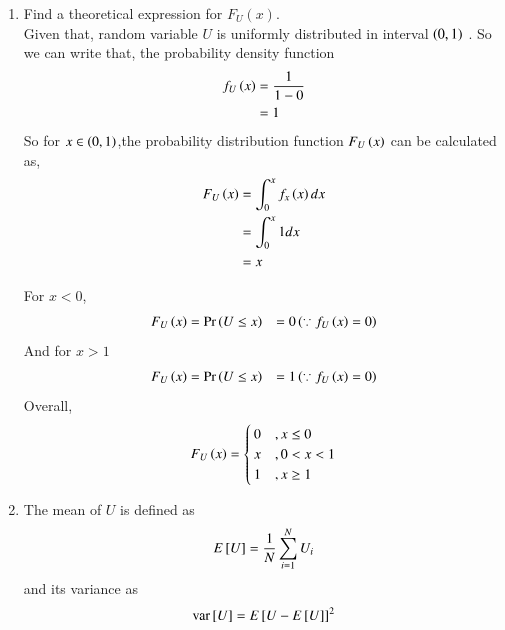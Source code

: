 \documentclass[journal,12pt,twocolumn]{IEEEtran}
\renewcommand\thesection{\arabic{section}}
\begin{document}
\begin{enumerate}[label=\thesection.\arabic*,ref=\thesection.\theenumi]
%
\item
Find a theoretical expression for $F_{U}(x)$.\\
\solution Given that, random variable $U$ is uniformly distributed in interval $\left(0,1\right)$ . So we can write that, the probability density function
               \begin{align}
                        f_{U}\left(x\right) &= \frac{1}{1 -0}\\
                                      &= 1
               \end{align}
       So for $ x \in \left(0,1\right) $,the probability distribution function $F_{U}\left(x\right)$ can be calculated as,
               \begin{align}
                           F_{U}\left(x\right) &= \int_{0}^{x} f_x\left(x\right)dx\\
                                         &= \int_{0}^{x}1dx\\
                                         &= x
                \end{align}

       For $x<0$,
		\begin{align}
			F_{U}\left(x\right) &= \Pr\left(U \leq x\right)
				      &= 0 \left(\because f_{U}\left(x\right) = 0\right)
                \end{align}
	And for $x>1$
		\begin{align}
			F_{U}\left(x\right) &= \Pr\left(U \leq x\right)
			&= 1 \left(\because f_{U}\left(x\right) = 0\right)
    \end{align}
        Overall,		
		\begin{equation*}
			F_{U}\left(x\right) = \begin{cases}      \label{cdf_U}
                                                          0  &, x \leq 0 \\
                                                          x  &, 0<x<1 \\
                                                          1  & , x \geq 1
                                                        \end{cases}
                 \end{equation*}

\item
The mean of $U$ is defined as
%
\begin{equation}
E{}\left[U\right] = \frac{1}{N}\sum_{i=1}^{N}U_i
\end{equation}
%
and its variance as
%
\begin{equation}
\text{var}{}\left[U\right] = E{}\left[U- E{}\left[U\right]\right]^2 
\end{equation}


\end{enumerate}
\end{document}
